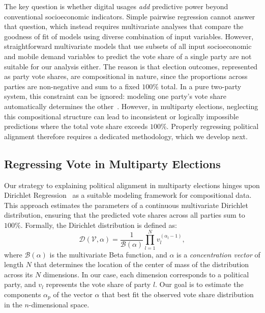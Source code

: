 \documentclass[9pt,sigconf,letterpaper]{acmart}
\begin{document}
The key question is whether digital usages \textit{add} predictive power beyond conventional socioeconomic indicators.
%
Simple pairwise regression cannot answer that question, which instead requires multivariate analyses that compare the goodness of fit of models using diverse combination of input variables. However, straightforward multivariate models that use subsets of all input socioeconomic and mobile demand variables to predict the vote share of a single party are not suitable for our analysis either.
The reason is that election outcomes, represented as party vote shares, are compositional in nature, since the proportions across parties are non-negative and sum to a fixed $100\%$ total.
In a pure two-party system, this constraint can be ignored: modeling one party’s vote share automatically determines the other~\cite{hanretty2021forecasting}.
However, in multiparty elections, neglecting this compositional structure can lead to inconsistent or logically impossible predictions where the total vote share exceeds $100\%$.
Properly regressing political alignment therefore requires a dedicated methodology, which we develop next.

\subsection{Regressing Vote in Multiparty Elections}
\label{sec:explain-model}

Our strategy to explaining political alignment in multiparty elections hinges upon Dirichlet Regression~\cite{hanretty2021forecasting, maier2014dirichletreg} as a suitable modeling framework for compositional data.
This approach estimates the parameters of a continuous multivariate Dirichlet distribution, ensuring that the predicted vote shares across all parties sum to $100\%$.
Formally, the Dirichlet distribution is defined as:
\begin{equation}
\mathcal{D}(\mathcal{V}, \alpha) = \frac{1}{\mathcal{B}(\alpha)} \prod_{l=1}^{N} v_{l}^{(\alpha_{l} -1)},
\label{eq:dirichlet_distribution}
\end{equation}
where $\mathcal{B}(\alpha)$ is the multivariate Beta function, and $\alpha$ is a \textit{concentration vector} of length $N$ that determines the location of the center of mass of the distribution across its $N$ dimensions.
In our case, each dimension corresponds to a political party, and $v_l$ represents the vote share of party $l$.
Our goal is to estimate the components $\alpha_p$ of the vector $\alpha$ that best fit the observed vote share distribution in the $n$-dimensional space.
\end{document}
